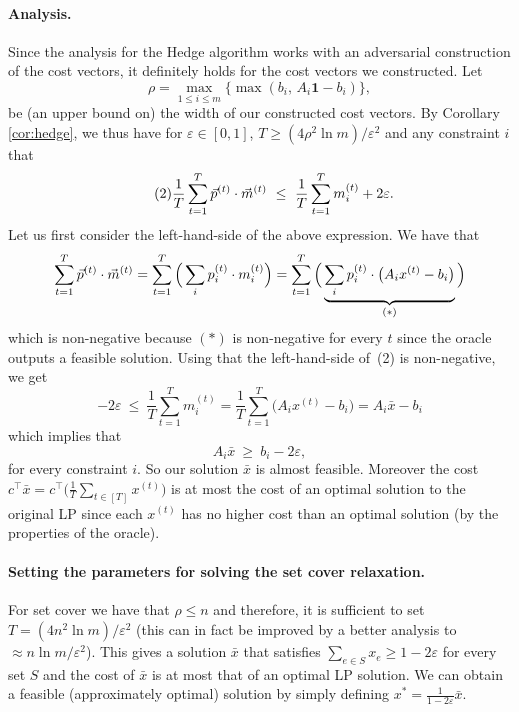 \paragraph{Analysis.} Since the analysis for the Hedge algorithm works with an adversarial
construction of the cost vectors, it definitely holds for the cost vectors we constructed. Let
\[
  \rho=\max_{1\le i\le m}\{\max(b_i,\,A_i\mathbf{1}-b_i)\},
\]
be (an upper bound on) the width of our constructed cost vectors. By Corollary \ref{cor:hedge}, we thus have for
$\varepsilon\in[0,1]$, $T\ge(4\rho^2\ln m)/\varepsilon^2$ and any constraint $i$ that
\begin{equation}\tag{2}
  \frac1T\sum_{t=1}^T\vec{p}^{(t)}\cdot\vec{m}^{(t)}\ \le\ \frac1T\sum_{t=1}^T m_i^{(t)}+2\varepsilon.
\end{equation}
Let us first consider the left-hand-side of the above expression. We have that
\[
  \sum_{t=1}^T\vec{p}^{(t)}\cdot\vec{m}^{(t)}=\sum_{t=1}^T\Big(\sum_i p_i^{(t)}\cdot m_i^{(t)}\Big)
  =\sum_{t=1}^T\Big(\underbrace{\sum_i p_i^{(t)}\cdot\big(A_i x^{(t)}-b_i\big)}_{(*)}\Big)
\]
which is non-negative because $(*)$ is non-negative for every $t$ since the oracle outputs a
feasible solution. Using that the left-hand-side of~(2) is non-negative, we get
\[
  -2\varepsilon\ \le\ \frac1T\sum_{t=1}^T m_i^{(t)}=\frac1T\sum_{t=1}^T\big(A_i x^{(t)}-b_i\big)=A_i\bar x-b_i
\]
which implies that
\[
  A_i\bar x\ \ge\ b_i-2\varepsilon,
\]
for every constraint $i$. So our solution $\bar x$ is almost feasible. Moreover the cost
$c^{\top}\bar x=c^{\top}\big(\frac1T\sum_{t\in[T]}x^{(t)}\big)$ is at most the cost of an optimal
solution to the original LP since each $x^{(t)}$ has no higher cost than an optimal solution (by the
properties of the oracle).

\paragraph{Setting the parameters for solving the set cover relaxation.} For set cover we have that
$\rho\le n$ and therefore, it is sufficient to set $T=(4n^2\ln m)/\varepsilon^2$ (this can in fact
be improved by a better analysis to $\approx n\ln m/\varepsilon^2$). This gives a solution $\bar x$
that satisfies $\sum_{e\in S}x_e\ge 1-2\varepsilon$ for every set $S$ and the cost of $\bar x$ is at
most that of an optimal LP solution. We can obtain a feasible (approximately optimal) solution by
simply defining $x^*=\frac{1}{1-2\varepsilon}\bar x$.

% 
